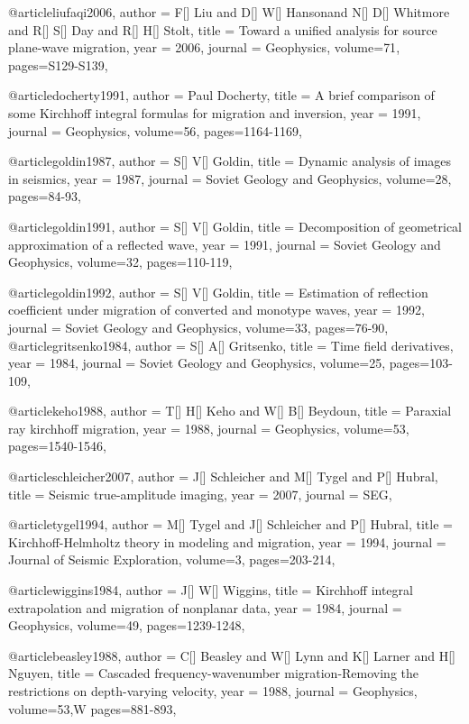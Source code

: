 {@article{liufaqi2006,
  author =	 {F[] Liu and D[] W[] Hansonand N[] D[] Whitmore and R[] S[] Day and R[] H[] Stolt},
  title =	 {Toward a unified analysis for source plane-wave migration},
  year =	 2006,
  journal =	 {Geophysics},
  volume={71},
 pages=S129-S139,
}

@article{docherty1991,
  author =	 {Paul Docherty},
  title =	 {A brief comparison of some Kirchhoff integral formulas for migration and inversion},
  year =	 1991,
  journal =	 {Geophysics},
  volume={56},
 pages=1164-1169,
}

@article{goldin1987,
  author =	 {S[] V[] Goldin},
  title =	 {Dynamic analysis of images in seismics},
  year =	 1987,
  journal =	 {Soviet Geology and Geophysics},
  volume={28},
 pages=84-93,
}

@article{goldin1991,
  author =	 {S[] V[] Goldin},
  title =	 {Decomposition of geometrical approximation of a reflected wave},
  year =	 1991,
  journal =	 {Soviet Geology and Geophysics},
  volume={32},
 pages=110-119,
}

@article{goldin1992,
  author =	 {S[] V[] Goldin},
  title =	 {Estimation of reflection coefficient under migration of converted and monotype waves},
  year =	 1992,
  journal =	 {Soviet Geology and Geophysics},
  volume={33},
 pages=76-90,
}
@article{gritsenko1984,
  author =	 {S[] A[] Gritsenko},
  title =	 {Time field derivatives},
  year =	 1984,
  journal =	 {Soviet Geology and Geophysics},
  volume={25},
 pages=103-109,
}

@article{keho1988,
  author =	 {T[] H[] Keho and W[] B[] Beydoun},
  title =	 {Paraxial ray kirchhoff migration},
  year =	 1988,
  journal =	 {Geophysics},
  volume={53},
 pages=1540-1546,
}

@article{schleicher2007,
  author =	 {J[] Schleicher and M[] Tygel and P[] Hubral},
  title =	 {Seismic true-amplitude imaging},
  year =	 2007,
  journal =	 {SEG},
}

@article{tygel1994,
  author =	 {M[] Tygel and J[] Schleicher and P[] Hubral},
  title =	 {Kirchhoff-Helmholtz theory in modeling and migration},
  year =	 1994,
  journal =	 {Journal of Seismic Exploration},
  volume={3},
 pages=203-214,
}

@article{wiggins1984,
  author =	 {J[] W[] Wiggins},
  title =	 {Kirchhoff integral extrapolation and migration of nonplanar data},
  year =	 1984,
  journal =	 {Geophysics},
  volume={49},
 pages=1239-1248,
}

@article{beasley1988,
  author =	 {C[] Beasley and W[] Lynn and K[] Larner and H[] Nguyen},
  title =	 {Cascaded frequency-wavenumber migration-Removing the restrictions on depth-varying velocity},
  year =	 1988,
  journal =	 {Geophysics},
  volume={53},W
 pages=881-893,
}

}
